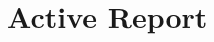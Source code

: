 \documentclass[dvipdfmx, unicode, 169]{beamer}
\begin{document}




\section{Active Report}
\end{document}
